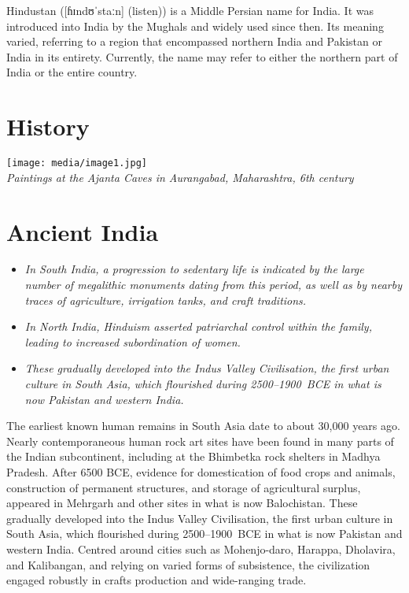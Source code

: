 Hindustan ({[}ɦɪndʊˈstaːn{]} (listen)) is a Middle Persian name for
India. It was introduced into India by the Mughals and widely used since
then. Its meaning varied, referring to a region that encompassed
northern India and Pakistan or India in its entirety. Currently, the
name may refer to either the northern part of India or the entire
country.

\section{History}\label{history}

\texttt{[image: media/image1.jpg]}\\
\emph{Paintings at the Ajanta Caves in Aurangabad, Maharashtra, 6th
century}

\section{Ancient India}\label{ancient-india}

\begin{itemize}
\item
  \emph{In South India, a progression to sedentary life is indicated by
  the large number of megalithic monuments dating from this period, as
  well as by nearby traces of agriculture, irrigation tanks, and craft
  traditions.}
\item
  \emph{In North India, Hinduism asserted patriarchal control within the
  family, leading to increased subordination of women.}
\item
  \emph{These gradually developed into the Indus Valley Civilisation,
  the first urban culture in South Asia, which flourished during
  2500--1900~BCE in what is now Pakistan and western India.}
\end{itemize}

The earliest known human remains in South Asia date to about 30,000
years ago. Nearly contemporaneous human rock art sites have been found
in many parts of the Indian subcontinent, including at the Bhimbetka
rock shelters in Madhya Pradesh. After 6500 BCE, evidence for
domestication of food crops and animals, construction of permanent
structures, and storage of agricultural surplus, appeared in Mehrgarh
and other sites in what is now Balochistan. These gradually developed
into the Indus Valley Civilisation, the first urban culture in South
Asia, which flourished during 2500--1900~BCE in what is now Pakistan and
western India. Centred around cities such as Mohenjo-daro, Harappa,
Dholavira, and Kalibangan, and relying on varied forms of subsistence,
the civilization engaged robustly in crafts production and wide-ranging
trade.

